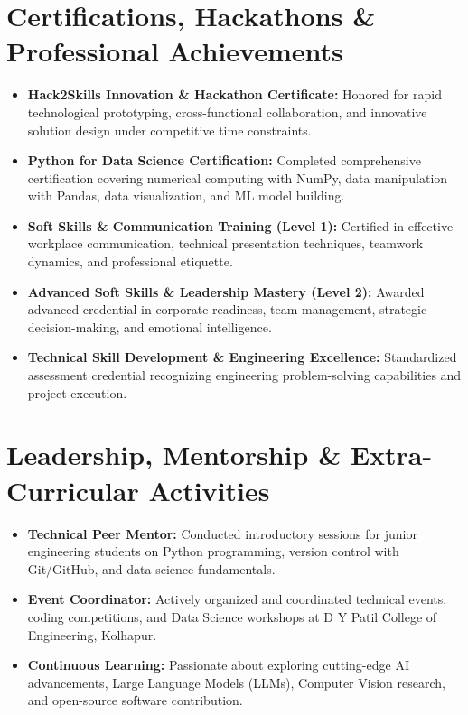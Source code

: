 \documentclass[a4paper,10pt]{article}
\begin{document}
\section{Certifications, Hackathons \& Professional Achievements}
\begin{itemize}
    \item \textbf{Hack2Skills Innovation \& Hackathon Certificate:} Honored for rapid technological prototyping, cross-functional collaboration, and innovative solution design under competitive time constraints.
    \item \textbf{Python for Data Science Certification:} Completed comprehensive certification covering numerical computing with NumPy, data manipulation with Pandas, data visualization, and ML model building.
    \item \textbf{Soft Skills \& Communication Training (Level 1):} Certified in effective workplace communication, technical presentation techniques, teamwork dynamics, and professional etiquette.
    \item \textbf{Advanced Soft Skills \& Leadership Mastery (Level 2):} Awarded advanced credential in corporate readiness, team management, strategic decision-making, and emotional intelligence.
    \item \textbf{Technical Skill Development \& Engineering Excellence:} Standardized assessment credential recognizing engineering problem-solving capabilities and project execution.
\end{itemize}

\section{Leadership, Mentorship \& Extra-Curricular Activities}
\begin{itemize}
    \item \textbf{Technical Peer Mentor:} Conducted introductory sessions for junior engineering students on Python programming, version control with Git/GitHub, and data science fundamentals.
    \item \textbf{Event Coordinator:} Actively organized and coordinated technical events, coding competitions, and Data Science workshops at D Y Patil College of Engineering, Kolhapur.
    \item \textbf{Continuous Learning:} Passionate about exploring cutting-edge AI advancements, Large Language Models (LLMs), Computer Vision research, and open-source software contribution.
\end{itemize}
\end{document}
